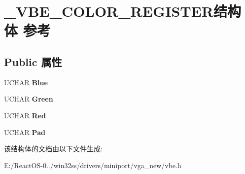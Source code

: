\hypertarget{struct___v_b_e___c_o_l_o_r___r_e_g_i_s_t_e_r}{}\section{\+\_\+\+V\+B\+E\+\_\+\+C\+O\+L\+O\+R\+\_\+\+R\+E\+G\+I\+S\+T\+E\+R结构体 参考}
\label{struct___v_b_e___c_o_l_o_r___r_e_g_i_s_t_e_r}
\subsection*{Public 属性}
\begin{DoxyCompactItemize}
\item 
\mbox{\label{struct___v_b_e___c_o_l_o_r___r_e_g_i_s_t_e_r_a6528399941b5cd790488e9390e1cfea0}} 
U\+C\+H\+AR {\bfseries Blue}
\item 
\mbox{\label{struct___v_b_e___c_o_l_o_r___r_e_g_i_s_t_e_r_aa46430d6be21f93d11a06c96f80f5a52}} 
U\+C\+H\+AR {\bfseries Green}
\item 
\mbox{\label{struct___v_b_e___c_o_l_o_r___r_e_g_i_s_t_e_r_ac37c3542c2fb5d02c599ea3144821e80}} 
U\+C\+H\+AR {\bfseries Red}
\item 
\mbox{\label{struct___v_b_e___c_o_l_o_r___r_e_g_i_s_t_e_r_a428cd11a2db0b7a6accd44f8970b4c86}} 
U\+C\+H\+AR {\bfseries Pad}
\end{DoxyCompactItemize}


该结构体的文档由以下文件生成\+:\begin{DoxyCompactItemize}
\item 
E\+:/\+React\+O\+S-\/0../win32ss/drivers/miniport/vga\+\_\+new/vbe.\+h\end{DoxyCompactItemize}
